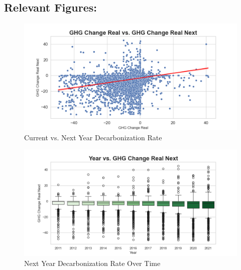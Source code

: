 


\subsection{Relevant Figures:}

\begin{figure}[H]
\centering
  \includegraphics[width=\textwidth]{figures/ghg_change_real_vs_ghg_change_real_next.png}
\caption{Current vs. Next Year Decarbonization Rate}
\label{fig:ghg_change_real_vs_ghg_change_real_next}
\end{figure}

\begin{figure}[H]
\centering
  \includegraphics[width=\textwidth]{figures/year_vs_ghg_change_real_next.png}
\caption{Next Year Decarbonization Rate Over Time}
\label{fig:ghg_change_real_vs_year}
\end{figure}

    


